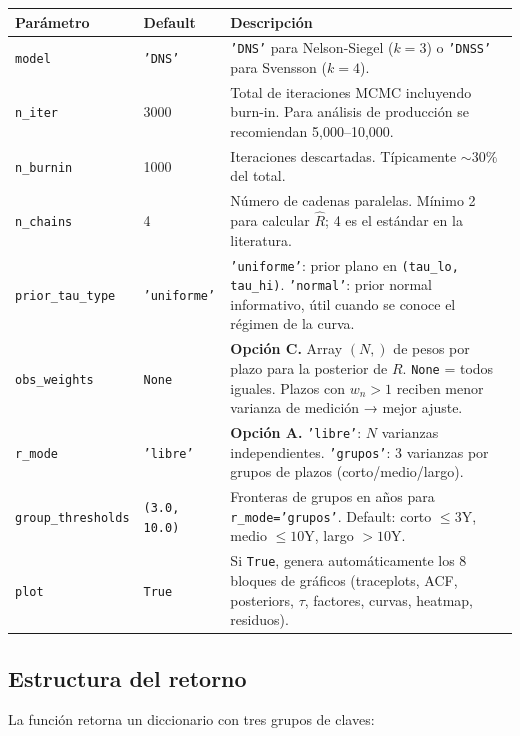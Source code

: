 \documentclass[12pt, a4paper]{article}
\theoremstyle{plain}
\theoremstyle{definition}
\theoremstyle{remark}
\begin{document}
\begin{longtable}{L{3.5cm} L{2cm} L{8.5cm}}
\toprule
\textbf{Parámetro} & \textbf{Default} & \textbf{Descripción} \\
\midrule
\endhead
\bottomrule
\endfoot
\texttt{model} & \texttt{'DNS'} &
  \texttt{'DNS'} para Nelson-Siegel ($k=3$) o \texttt{'DNSS'} para Svensson ($k=4$). \\
\addlinespace
\texttt{n\_iter} & 3000 &
  Total de iteraciones MCMC incluyendo burn-in. Para análisis de producción
  se recomiendan 5,000--10,000. \\
\addlinespace
\texttt{n\_burnin} & 1000 &
  Iteraciones descartadas. Típicamente $\sim 30\%$ del total. \\
\addlinespace
\texttt{n\_chains} & 4 &
  Número de cadenas paralelas. Mínimo 2 para calcular $\hat{R}$;
  4 es el estándar en la literatura. \\
\addlinespace
\texttt{prior\_tau\_type} & \texttt{'uniforme'} &
  \texttt{'uniforme'}: prior plano en \texttt{(tau\_lo, tau\_hi)}.
  \texttt{'normal'}: prior normal informativo, útil cuando se conoce el
  régimen de la curva. \\
\addlinespace
\texttt{obs\_weights} & \texttt{None} &
  \textbf{Opción C.} Array $(N,)$ de pesos por plazo para la posterior de $R$.
  \texttt{None} = todos iguales. Plazos con $w_n > 1$ reciben menor varianza
  de medición → mejor ajuste. \\
\addlinespace
\texttt{r\_mode} & \texttt{'libre'} &
  \textbf{Opción A.} \texttt{'libre'}: $N$ varianzas independientes.
  \texttt{'grupos'}: 3 varianzas por grupos de plazos (corto/medio/largo). \\
\addlinespace
\texttt{group\_thresholds} & \texttt{(3.0, 10.0)} &
  Fronteras de grupos en años para \texttt{r\_mode='grupos'}.
  Default: corto $\leq 3$Y, medio $\leq 10$Y, largo $> 10$Y. \\
\addlinespace
\texttt{plot} & \texttt{True} &
  Si \texttt{True}, genera automáticamente los 8 bloques de gráficos
  (traceplots, ACF, posteriors, $\tau$, factores, curvas, heatmap, residuos). \\
\end{longtable}

\subsection{Estructura del retorno}

La función retorna un diccionario con tres grupos de claves:
\end{document}
